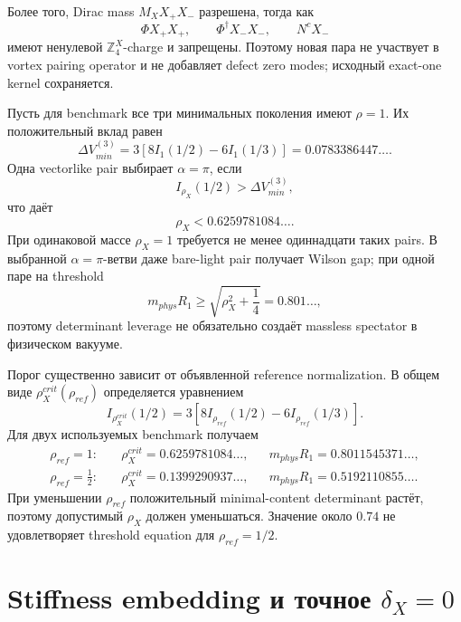 Более того, Dirac mass \(M_XX_+X_-\) разрешена, тогда как
\begin{equation}
 \Phi X_+X_+,
 \qquad
 \Phi^\dagger X_-X_-,
 \qquad
 N^cX_-
\end{equation}
имеют ненулевой \(\mathbb Z_4^X\)-charge и запрещены. Поэтому новая пара не
участвует в vortex pairing operator и не добавляет defect zero modes;
исходный exact-one kernel сохраняется.

Пусть для benchmark все три минимальных поколения имеют \(\rho=1\). Их
положительный вклад равен
\begin{equation}
 \Delta V_{min}^{(3)}
 =3\left[8I_1(1/2)-6I_1(1/3)\right]
 =0.0783386447\ldots.
\end{equation}
Одна vectorlike pair выбирает \(\alpha=\pi\), если
\begin{equation}
 I_{\rho_X}(1/2)>\Delta V_{min}^{(3)},
\end{equation}
что даёт
\begin{equation}
 \rho_X<0.6259781084\ldots.
\end{equation}
При одинаковой массе \(\rho_X=1\) требуется не менее одиннадцати таких
pairs. В выбранной \(\alpha=\pi\)-ветви даже bare-light pair получает
Wilson gap; при одной паре на threshold
\begin{equation}
 m_{phys}R_1\geq
 \sqrt{\rho_X^2+\frac14}=0.801\ldots,
\end{equation}
поэтому determinant leverage не обязательно создаёт massless spectator в
физическом вакууме.

Порог существенно зависит от объявленной reference normalization. В общем
виде \(\rho_X^{crit}(\rho_{ref})\) определяется уравнением
\begin{equation}
 I_{\rho_X^{crit}}(1/2)
 =3\left[
 8I_{\rho_{ref}}(1/2)-6I_{\rho_{ref}}(1/3)
 \right].
\end{equation}
Для двух используемых benchmark получаем
\begin{align}
 \rho_{ref}=1:
 &\quad \rho_X^{crit}=0.6259781084\ldots,
 &&m_{phys}R_1=0.8011545371\ldots,\\
 \rho_{ref}=\frac12:
 &\quad \rho_X^{crit}=0.1399290937\ldots,
 &&m_{phys}R_1=0.5192110855\ldots.
\end{align}
При уменьшении \(\rho_{ref}\) положительный minimal-content determinant
растёт, поэтому допустимый \(\rho_X\) должен уменьшаться. Значение около
\(0.74\) не удовлетворяет threshold equation для \(\rho_{ref}=1/2\).

\section{Stiffness embedding и точное \(\delta_X=0\)}

